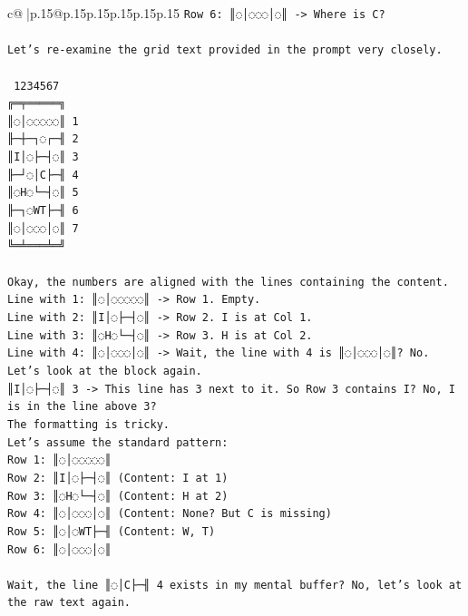 \documentclass{article}
\begin{document}
{\begin{supertabular}{c@{$\;$}|p{.15\linewidth}@{}p{.15\linewidth}p{.15\linewidth}p{.15\linewidth}p{.15\linewidth}p{.15\linewidth}}
{{{\texttt{Row 6: ║◌│◌◌◌│◌║ {-}> Where is C?} \\
\\ 
\texttt{Let's re{-}examine the grid text provided in the prompt very closely.} \\
\\ 
\texttt{ 1234567} \\
\texttt{╔═╤═════╗} \\
\texttt{║◌│◌◌◌◌◌║ 1} \\
\texttt{╟─┼─┐◌┌─╢ 2} \\
\texttt{║I│◌├─┤◌║ 3} \\
\texttt{╟─┘◌│C├─╢ 4} \\
\texttt{║◌H◌└─┤◌║ 5} \\
\texttt{╟─┐◌WT├─╢ 6} \\
\texttt{║◌│◌◌◌│◌║ 7} \\
\texttt{╚═╧═══╧═╝} \\
\\ 
\texttt{Okay, the numbers are aligned with the lines containing the content.} \\
\texttt{Line with 1: ║◌│◌◌◌◌◌║ {-}> Row 1. Empty.} \\
\texttt{Line with 2: ║I│◌├─┤◌║ {-}> Row 2. I is at Col 1.} \\
\texttt{Line with 3: ║◌H◌└─┤◌║ {-}> Row 3. H is at Col 2.} \\
\texttt{Line with 4: ║◌│◌◌◌│◌║ {-}> Wait, the line with 4 is ║◌│◌◌◌│◌║? No.} \\
\texttt{Let's look at the block again.} \\
\texttt{║I│◌├─┤◌║ 3 {-}> This line has 3 next to it. So Row 3 contains I? No, I is in the line above 3?} \\
\texttt{The formatting is tricky.} \\
\texttt{Let's assume the standard pattern:} \\
\texttt{Row 1: ║◌│◌◌◌◌◌║} \\
\texttt{Row 2: ║I│◌├─┤◌║ (Content: I at 1)} \\
\texttt{Row 3: ║◌H◌└─┤◌║ (Content: H at 2)} \\
\texttt{Row 4: ║◌│◌◌◌│◌║ (Content: None? But C is missing)} \\
\texttt{Row 5: ║◌│◌WT├─╢ (Content: W, T)} \\
\texttt{Row 6: ║◌│◌◌◌│◌║} \\
\\ 
\texttt{Wait, the line ║◌│C├─╢ 4 exists in my mental buffer? No, let's look at the raw text again.} \\
\\ 
}}}
\end{supertabular}}
\end{document}
